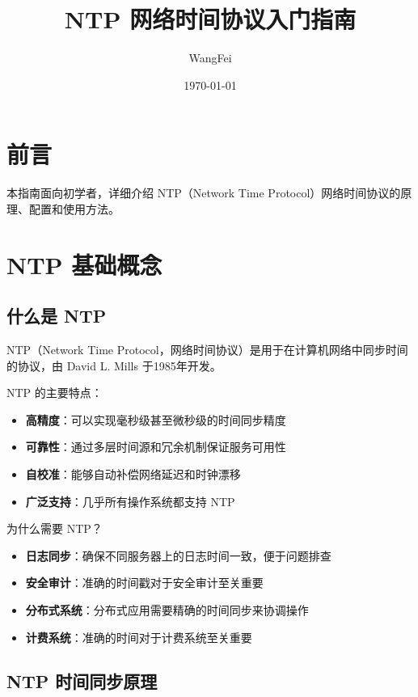 \documentclass[12pt,UTF8]{ctexbook}
\title{\heiti\zihao{0} NTP 网络时间协议入门指南}
\author{WangFei}
\date{\today}
\begin{document}
\maketitle
\tableofcontents

\frontmatter
\chapter{前言}

本指南面向初学者，详细介绍 NTP（Network Time Protocol）网络时间协议的原理、配置和使用方法。

\mainmatter

\chapter{NTP 基础概念}
\label{chap:ntp_basics}

\section{什么是 NTP}
\label{sec:what_is_ntp}

NTP（Network Time Protocol，网络时间协议）是用于在计算机网络中同步时间的协议，由 David L. Mills 于1985年开发。

NTP 的主要特点：
\begin{itemize}
    \item \textbf{高精度}：可以实现毫秒级甚至微秒级的时间同步精度
    \item \textbf{可靠性}：通过多层时间源和冗余机制保证服务可用性
    \item \textbf{自校准}：能够自动补偿网络延迟和时钟漂移
    \item \textbf{广泛支持}：几乎所有操作系统都支持 NTP
\end{itemize}

为什么需要 NTP？
\begin{itemize}
    \item \textbf{日志同步}：确保不同服务器上的日志时间一致，便于问题排查
    \item \textbf{安全审计}：准确的时间戳对于安全审计至关重要
    \item \textbf{分布式系统}：分布式应用需要精确的时间同步来协调操作
    \item \textbf{计费系统}：准确的时间对于计费系统至关重要
\end{itemize}

\section{NTP 时间同步原理}
\label{sec:ntp_synchronization_principle}
\end{document}
